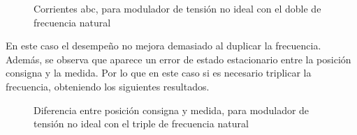\documentclass[a4paper, 10pt, onecolumn,journal]{ieeeconf}
\begin{document}
\begin{figure}[H]
	\centering
	\begin{adjustbox}{max width=\columnwidth}
	\end{adjustbox}
	\caption{Corrientes abc, para modulador de tensión no ideal con el doble de frecuencia natural}
	\label{Corrientes abc, para modulador de tensión no ideal con el doble de frecuencia natural}
\end{figure}
En este caso el desempeño no mejora demasiado al duplicar la frecuencia. Además, se observa que aparece un error de estado estacionario entre la posición consigna y la medida. Por lo que en este caso si es necesario triplicar la frecuencia, obteniendo los siguientes resultados.
\begin{figure}[H]
	\centering
	\begin{adjustbox}{max width=\columnwidth}
	\end{adjustbox}
	\caption{Diferencia entre posición consigna y medida, para modulador de tensión no ideal con el triple de frecuencia natural}
	\label{Diferencia entre posición consigna y medida, para modulador de tensión no ideal con el triple de frecuencia natural}
\end{figure}
\end{document}
